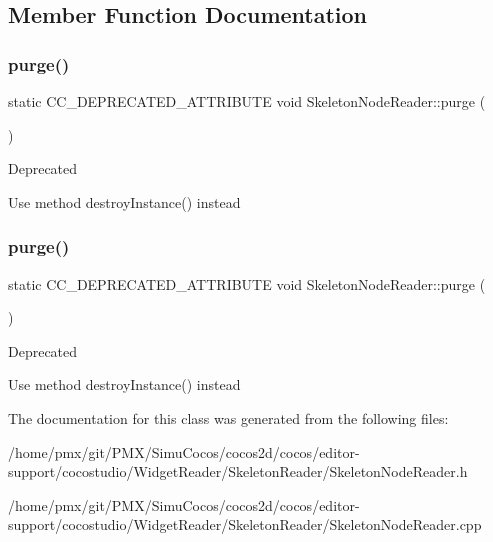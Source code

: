 \subsection{Member Function Documentation}
\mbox{\label{classSkeletonNodeReader_abbdbf89e485d6b31726c83bb1fa0904a}} 
\subsubsection{\texorpdfstring{purge()}{purge()}\hspace{0.1cm}{\footnotesize\ttfamily [1/2]}}
{\footnotesize\ttfamily static C\+C\+\_\+\+D\+E\+P\+R\+E\+C\+A\+T\+E\+D\+\_\+\+A\+T\+T\+R\+I\+B\+U\+TE void Skeleton\+Node\+Reader\+::purge (\begin{DoxyParamCaption}{ }\end{DoxyParamCaption})\hspace{0.3cm}{\ttfamily [static]}}

\begin{DoxyRefDesc}{Deprecated}
\item[\hyperlink{deprecated__deprecated000103}{Deprecated}]Use method destroy\+Instance() instead \end{DoxyRefDesc}
\mbox{\label{classSkeletonNodeReader_abbdbf89e485d6b31726c83bb1fa0904a}} 
\subsubsection{\texorpdfstring{purge()}{purge()}\hspace{0.1cm}{\footnotesize\ttfamily [2/2]}}
{\footnotesize\ttfamily static C\+C\+\_\+\+D\+E\+P\+R\+E\+C\+A\+T\+E\+D\+\_\+\+A\+T\+T\+R\+I\+B\+U\+TE void Skeleton\+Node\+Reader\+::purge (\begin{DoxyParamCaption}{ }\end{DoxyParamCaption})\hspace{0.3cm}{\ttfamily [static]}}

\begin{DoxyRefDesc}{Deprecated}
\item[\hyperlink{deprecated__deprecated000338}{Deprecated}]Use method destroy\+Instance() instead \end{DoxyRefDesc}


The documentation for this class was generated from the following files\+:\begin{DoxyCompactItemize}
\item 
/home/pmx/git/\+P\+M\+X/\+Simu\+Cocos/cocos2d/cocos/editor-\/support/cocostudio/\+Widget\+Reader/\+Skeleton\+Reader/Skeleton\+Node\+Reader.\+h\item 
/home/pmx/git/\+P\+M\+X/\+Simu\+Cocos/cocos2d/cocos/editor-\/support/cocostudio/\+Widget\+Reader/\+Skeleton\+Reader/Skeleton\+Node\+Reader.\+cpp\end{DoxyCompactItemize}
